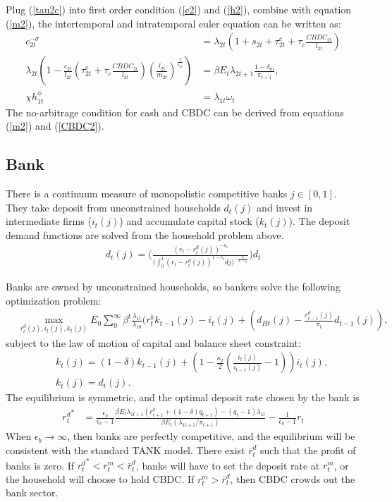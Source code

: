 \documentclass[12pt]{article}
\begin{document}
Plug (\ref{tau2c}) into first order condition (\ref{c2}) and  (\ref{h2}), combine with equation (\ref{m2}), the intertemporal and intratemporal euler equation can be written as: 
\begin{align*}
c_{2t}^{-\sigma} &= \lambda_{2t}(1+s_{2t}+\tau_{2t}^c+\tau_c\frac{CBDC_{2t}}{l_{2t}}) \\
\lambda_{2t}(1-\frac{c_{2t}}{l_{2t}}(\tau_{2t}^c+\tau_c\frac{CBDC_{2t}}{l_{2t}})(\frac{l_{2t}}{m_{2t}})^{\frac{1}{\epsilon_m}}) &= \beta E_t \lambda_{2t+1} \frac{1-\delta_m}{\pi_{t+1}}, \\
\chi h_{1t}^{\phi} &= \lambda_{1t}\omega_t 
\end{align*}
The no-arbitrage condition for cash and CBDC can be derived from equations (\ref{m2}) and (\ref{CBDC2}).

\subsection{Bank}
There is a continuum measure of monopolistic competitive banks $j \in [0,1]$. They take deposit from unconstrained households $d_{t}(j)$ and invest in intermediate firms ($i_t(j)$) and accumulate capital stock ($k_t(j)$). The deposit demand functions are solved from the household problem above. 
\begin{align*}
d_{t}(j) = \Biggl(\frac{(r_t-r_t^d(j))^{-\epsilon_b}}{\big(\int_0^1(r_t-r_t^d(j))^{1-\epsilon_b}dj\big)^{-\frac{\epsilon_b}{1-\epsilon_b}}}\Biggl)d_{t} 
\end{align*}

Banks are owned by unconstrained households, so bankers solve the following optimization problem: 
\begin{align*}
 &\max_{r_t^d(j),i_t(j),k_t(j)}E_0 \sum_0^{\infty}\beta^t\frac{\lambda_{1t}}{\lambda_{10}}(r_t^kk_{t-1}(j)-i_t(j)+(d_{Ht}(j)-\frac{r_{t-1}^d(j)}{\pi_t}d_{t-1}(j)),
 \end{align*}
subject to the law of motion of capital and balance sheet constraint: 
 \begin{align*}
  \quad & k_t(j) = (1-\delta)k_{t-1}(j)+(1-\frac{\kappa_I}{2}(\frac{i_t(j)}{i_{t-1}(j)}-1))i_t(j), \\
& k_t(j) = d_{t}(j).
\end{align*}
The equilibrium is symmetric, and the optimal deposit rate chosen by the bank is 
\begin{align*}
{r_{t}^d}^* &= \frac{\epsilon_b}{\epsilon_b-1}\frac{\beta E_t \lambda_{1t+1}(r_{t+1}^k+(1-\delta)q_{t+1})-(q_t-1)\lambda_{1t}}{\beta E_t (\lambda_{1t+1}/\pi_{t+1})}-\frac{1}{\epsilon_b-1}r_t 
\end{align*}
When $\epsilon_b \to \infty$, then banks are perfectly competitive, and the equilibrium will be consistent with the standard TANK model. 
There exist $\bar{r}_t^d$ such that the profit of banks is zero. If ${r_t^d}^*<r_t^m<\bar{r}_t^d$, banks will have to set the deposit rate at $r_t^m$, or the household will choose to hold CBDC. If $r_t^m>\bar{r}_t^d$, then CBDC crowds out the bank sector. 
\end{document}
